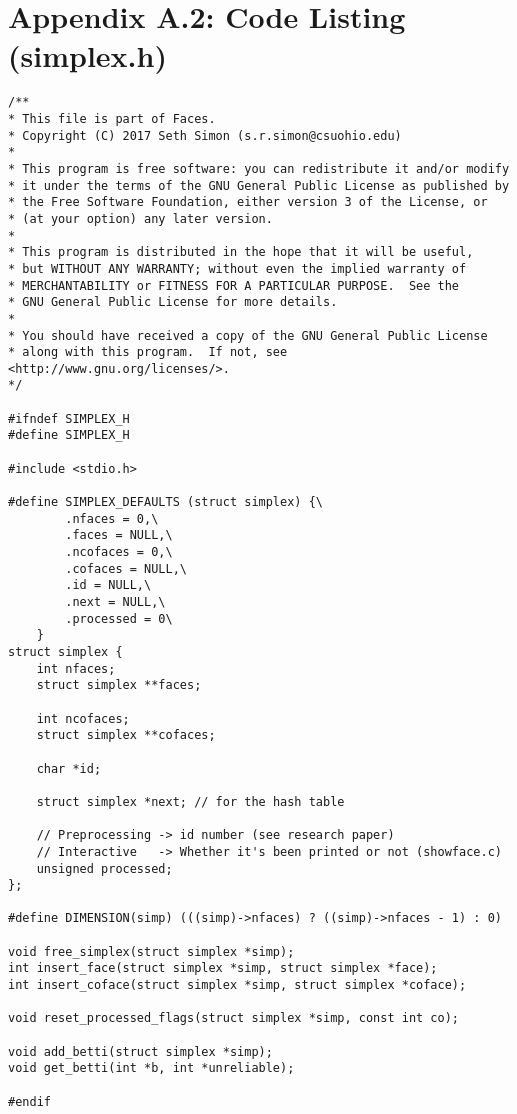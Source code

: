 \documentclass{article}
\begin{document}
\section{Appendix A.2: Code Listing (simplex.h)}
\small
\begin{verbatim}
/**
* This file is part of Faces.
* Copyright (C) 2017 Seth Simon (s.r.simon@csuohio.edu)
* 
* This program is free software: you can redistribute it and/or modify
* it under the terms of the GNU General Public License as published by
* the Free Software Foundation, either version 3 of the License, or
* (at your option) any later version.
* 
* This program is distributed in the hope that it will be useful,
* but WITHOUT ANY WARRANTY; without even the implied warranty of
* MERCHANTABILITY or FITNESS FOR A PARTICULAR PURPOSE.  See the
* GNU General Public License for more details.
* 
* You should have received a copy of the GNU General Public License
* along with this program.  If not, see <http://www.gnu.org/licenses/>.
*/

#ifndef SIMPLEX_H
#define SIMPLEX_H

#include <stdio.h>

#define SIMPLEX_DEFAULTS (struct simplex) {\
        .nfaces = 0,\
        .faces = NULL,\
        .ncofaces = 0,\
        .cofaces = NULL,\
        .id = NULL,\
        .next = NULL,\
        .processed = 0\
    }
struct simplex {
    int nfaces;
    struct simplex **faces;

    int ncofaces;
    struct simplex **cofaces;

    char *id;

    struct simplex *next; // for the hash table

    // Preprocessing -> id number (see research paper)
    // Interactive   -> Whether it's been printed or not (showface.c)
    unsigned processed;
};

#define DIMENSION(simp) (((simp)->nfaces) ? ((simp)->nfaces - 1) : 0)

void free_simplex(struct simplex *simp);
int insert_face(struct simplex *simp, struct simplex *face);
int insert_coface(struct simplex *simp, struct simplex *coface);

void reset_processed_flags(struct simplex *simp, const int co);

void add_betti(struct simplex *simp);
void get_betti(int *b, int *unreliable);

#endif
\end{verbatim}
\normalsize
\end{document}
